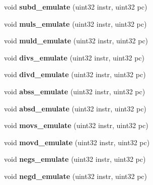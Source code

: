 \begin{DoxyCompactItemize}
\item 
\hypertarget{classFPU_a7ee6226cb58ef1fdc21157d9fe7036dc}{
void {\bfseries subd\_\-emulate} (uint32 instr, uint32 pc)}
\label{classFPU_a7ee6226cb58ef1fdc21157d9fe7036dc}

\item 
\hypertarget{classFPU_ad4ae687cb716f811d601cace20f883a6}{
void {\bfseries muls\_\-emulate} (uint32 instr, uint32 pc)}
\label{classFPU_ad4ae687cb716f811d601cace20f883a6}

\item 
\hypertarget{classFPU_a7850950f4e2a725d9dc6ea3c36af5786}{
void {\bfseries muld\_\-emulate} (uint32 instr, uint32 pc)}
\label{classFPU_a7850950f4e2a725d9dc6ea3c36af5786}

\item 
\hypertarget{classFPU_a4ba3a1b7552964876d23beb60162a390}{
void {\bfseries divs\_\-emulate} (uint32 instr, uint32 pc)}
\label{classFPU_a4ba3a1b7552964876d23beb60162a390}

\item 
\hypertarget{classFPU_a95f4b075be936d582b2ec856c520d8f7}{
void {\bfseries divd\_\-emulate} (uint32 instr, uint32 pc)}
\label{classFPU_a95f4b075be936d582b2ec856c520d8f7}

\item 
\hypertarget{classFPU_aa9bd06dbe14b181296977d830f98dce7}{
void {\bfseries abss\_\-emulate} (uint32 instr, uint32 pc)}
\label{classFPU_aa9bd06dbe14b181296977d830f98dce7}

\item 
\hypertarget{classFPU_a444a0fbf10bf86a785590f67c6e9eba3}{
void {\bfseries absd\_\-emulate} (uint32 instr, uint32 pc)}
\label{classFPU_a444a0fbf10bf86a785590f67c6e9eba3}

\item 
\hypertarget{classFPU_a1fa93a22a15dd20327642f3a371ebde7}{
void {\bfseries movs\_\-emulate} (uint32 instr, uint32 pc)}
\label{classFPU_a1fa93a22a15dd20327642f3a371ebde7}

\item 
\hypertarget{classFPU_a2ac46d52ed795327e1a7d41e8ae2f104}{
void {\bfseries movd\_\-emulate} (uint32 instr, uint32 pc)}
\label{classFPU_a2ac46d52ed795327e1a7d41e8ae2f104}

\item 
\hypertarget{classFPU_a6d4242b059ac00a92786b5b02b1f68ad}{
void {\bfseries negs\_\-emulate} (uint32 instr, uint32 pc)}
\label{classFPU_a6d4242b059ac00a92786b5b02b1f68ad}

\item 
\hypertarget{classFPU_a535c953956b80d1e1e19d486b581ae40}{
void {\bfseries negd\_\-emulate} (uint32 instr, uint32 pc)}
\label{classFPU_a535c953956b80d1e1e19d486b581ae40}


\end{DoxyCompactItemize}

